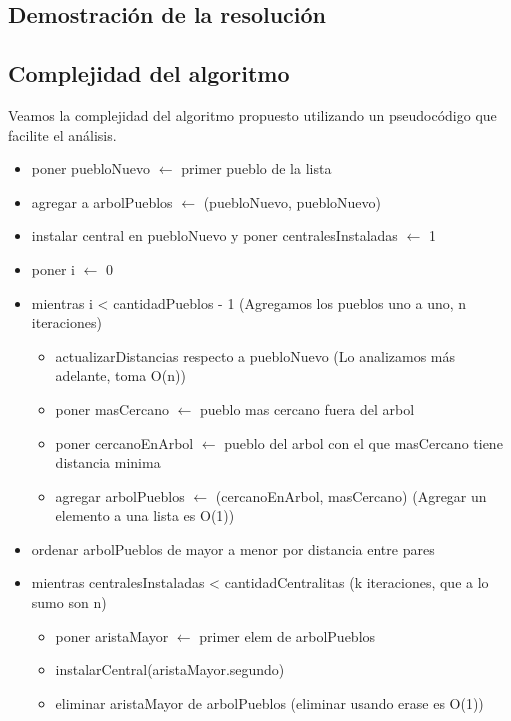 \subsection{Demostraci\'on de la resoluci\'on}

\subsection{Complejidad del algoritmo}

Veamos la complejidad del algoritmo propuesto utilizando un pseudoc\'odigo que facilite el an\'alisis.

\begin{itemize}
\item poner puebloNuevo $\leftarrow$ primer pueblo de la lista
\item agregar a arbolPueblos $\leftarrow$ (puebloNuevo, puebloNuevo)
\item instalar central en puebloNuevo y poner centralesInstaladas $\leftarrow$ 1
\item poner i $\leftarrow$ 0
\item mientras i < cantidadPueblos - 1 (Agregamos los pueblos uno a uno, n iteraciones)
\begin{itemize}
	\item actualizarDistancias respecto a puebloNuevo (Lo analizamos m\'as adelante, toma O(n))
	\item poner masCercano $\leftarrow$ pueblo mas cercano fuera del arbol
	\item poner cercanoEnArbol $\leftarrow$ pueblo del arbol con el que masCercano tiene distancia minima
	\item agregar arbolPueblos $\leftarrow$ (cercanoEnArbol, masCercano) (Agregar un elemento a una lista es O(1))
\end{itemize}
\item ordenar arbolPueblos de mayor a menor por distancia entre pares 
\item mientras centralesInstaladas < cantidadCentralitas (k iteraciones, que a lo sumo son n)
\begin{itemize}
	\item poner aristaMayor $\leftarrow$ primer elem de arbolPueblos
	\item instalarCentral(aristaMayor.segundo)
	\item eliminar aristaMayor de arbolPueblos (eliminar usando erase es O(1))
\end{itemize}
\end{itemize}

